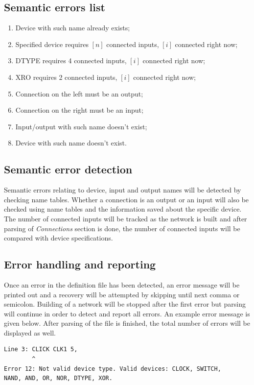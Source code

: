 \documentclass[12pt]{article}
\begin{document}
\subsection{Semantic errors list}
\begin{enumerate}
	\setlength{\itemsep}{1pt}
	\setlength{\parskip}{0pt}
	\setlength{\parsep}{0pt}
	
	\item {Device with such name already exists;}
	\item {Specified device requires $[n]$ connected inputs, $[i]$ connected right now;}
	\item {DTYPE requires 4 connected inputs, $[i]$ connected right now;}
	\item {XRO requires 2 connected inputs, $[i]$ connected right now;}
	\item {Connection on the left must be an output;}
	\item {Connection on the right must be an input;}
	\item {Input/output with such name doesn't exist;}
	\item {Device with such name doesn't exist.}
\end{enumerate}
	
\subsection{Semantic error detection}
Semantic errors relating to device, input and output names will be detected by checking name tables. Whether a connection is an output or an input will also be checked using name tables and the information saved about the specific device. The number of connected inputs will be tracked as the network is built and after parsing of \textit{Connections} section is done, the number of connected inputs will be compared with device specifications.

\subsection{Error handling and reporting}

Once an error in the definition file has been detected, an error message will be printed out and a recovery will be attempted by skipping until next comma or semicolon. Building of a network will be stopped after the first error but parsing will continue in order to detect and report all errors. An example error message is given below. After parsing of the file is finished, the total number of errors will be displayed as well.

\begin{verbatim}
Line 3: CLICK CLK1 5,
        ^
Error 12: Not valid device type. Valid devices: CLOCK, SWITCH,
NAND, AND, OR, NOR, DTYPE, XOR.
\end{verbatim}
\end{document}
